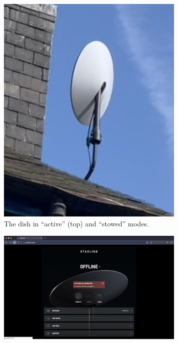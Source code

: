 \begin{figure}
\begin{subfigure}{.2\textwidth}
        \centering\includegraphics[width=\textwidth]{img/stowed.png}
        \caption{The dish in ``active'' (top) and ``stowed'' modes.}
    \end{subfigure}
    \begin{subfigure}{.5779\textwidth}
        \centering\includegraphics[width=\textwidth]{img/offline.png}\\\vspace{.35em}

\end{subfigure}
\end{figure}
